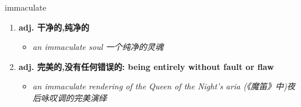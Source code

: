 
\begin{frame}
{\huge immaculate}
\begin{center}
\begin{enumerate}\Large
  \item \textbf{adj. 干净的,纯净的}
  \begin{itemize}
    \item \em{\Large{an immaculate soul 一个纯净的灵魂}}
  \end{itemize}
  \item \textbf{adj. 完美的,没有任何错误的: being entirely without fault or flaw}
  \begin{itemize}
    \item \em{\Large{an immaculate rendering of the Queen of the Night’s aria (《魔笛》中)夜后咏叹调的完美演绎}}
  \end{itemize}
\end{enumerate}
\end{center}
\end{frame}
